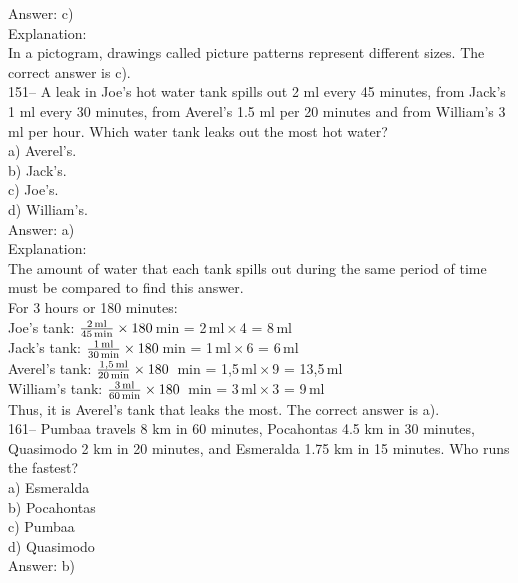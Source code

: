 \documentclass[letterpaper, 12pt]{article}
\begin{document}
Answer: c)\\

Explanation: \\
In a pictogram, drawings called picture patterns represent different sizes. The correct answer is c).\\


151-- A leak in Joe's hot water tank spills out 2 ml every 45 minutes, from Jack's 1 ml every 30 minutes, from Averel's 1.5 ml per 20 minutes and from William's 3 ml per hour. Which water tank leaks out the most hot water?\\
a) Averel's.\\
b) Jack's.\\
c) Joe's.\\
d) William's.\\

Answer: a)\\

Explanation:\\
The amount of water that each tank spills out during the same period of time must be compared to find this answer.\\

For 3 hours or 180 minutes: \\
Joe's tank:
$\frac{2\textrm{\,ml}}{45\textrm{\,min}}\times180$\,min =
2\,ml\,$\times$\,4 = 8\,ml\\ [2mm] Jack's tank:
$\frac{1\textrm{\,ml}}{30\textrm{\,min}}\times180$\,min =
1\,ml\,$\times$\,6 = 6\,ml\\ [2mm]
Averel's tank: $\frac{1,5\textrm{\,ml}}{20\textrm{\,min}}\times180$
\,min = 1,5\,ml\,$\times$\,9 = 13,5\,ml\\[2mm]
William's tank: $\frac{3\textrm{\,ml}}{60\textrm{\,min}}\times180$
\,min = 3\,ml\,$\times$\,3 = 9\,ml\\[2mm]
Thus, it is Averel's tank that leaks the most. The correct answer is a).\\


161-- Pumbaa travels 8 km in 60 minutes, Pocahontas 4.5 km in 30 minutes, Quasimodo 2 km in 20 minutes, and Esmeralda 1.75 km in 15 minutes. Who runs the fastest?\\

a) Esmeralda\\
b) Pocahontas\\
c) Pumbaa\\
d) Quasimodo\\

Answer: b)\\
\end{document}
